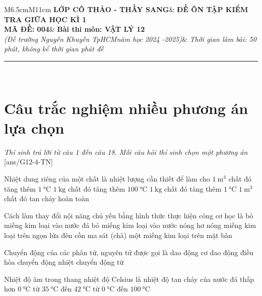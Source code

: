 \begin{tabular}{M{6.5cm}M{11cm}}
	\textbf{LỚP CÔ THẢO - THẦY SANG}& \textbf{ĐỀ ÔN TẬP KIỂM TRA GIỮA HỌC KÌ 1}\\
	\textbf{MÃ ĐỀ: 004}& \textbf{Bài thi môn: VẬT LÝ 12}\\
	\textit{(Đề trường Nguyễn Khuyến TpHCM\newline năm học 2024 -2025)}& \textit{Thời gian làm bài: 50 phút, không kể thời gian phát đề}
	
	\noindent\rule{4cm}{0.8pt} \\
\end{tabular}
\setcounter{section}{0}
\section{Câu trắc nghiệm nhiều phương án lựa chọn}
\textit{Thí sinh trả lời từ câu 1 đến câu 18. Mỗi câu hỏi thí sinh chọn một phương án}
\setcounter{ex}{0}
[ans/G12-4-TN]
\begin{ex}
	Nhiệt dung riêng của một chất là nhiệt lượng cần thiết để làm cho
	\choice
	{$\SI{1}{\meter^3}$ chất đó tăng thêm $\SI{1}{\celsius}$}
	{$\SI{1}{\kilogram}$ chất đó tăng thêm $\SI{100}{\celsius}$}
	{\True $\SI{1}{\kilogram}$ chất đó tăng thêm $\SI{1}{\celsius}$}
	{$\SI{1}{\meter^3}$ chất đó tan chảy hoàn toàn}
	\loigiai{}
\end{ex}
\begin{ex}
Cách làm thay đổi nội năng chủ yếu bằng hình thức thực hiện công cơ học là	
	\choice
	{bỏ miếng kim loại vào nước đá}
	{bỏ miếng kim loại vào nước nóng}
	{hơ nóng miếng kim loại trên ngọn lửa đèn cồn}
	{\True ma sát (chà) một miếng kim loại trên mặt bàn}
	\loigiai{}
\end{ex}
\begin{ex}
	Chuyển động của các phân tử, nguyên tử được gọi là
	\choice
	{dao động cơ}
	{dao động điều hòa}
	{\True chuyển động nhiệt}
	{chuyển động từ}
	\loigiai{}
\end{ex}
\begin{ex}
	Nhiệt độ âm trong thang nhiệt độ Celsius là nhiệt độ
	\choice
	{tan chảy của nước đá}
	{\True thấp hơn $\SI{0}{\celsius}$}
	{từ $\SI{35}{\celsius}$ đến $\SI{42}{\celsius}$}
	{từ $\SI{0}{\celsius}$ đến $\SI{100}{\celsius}$}
	\loigiai{}
\end{ex}
